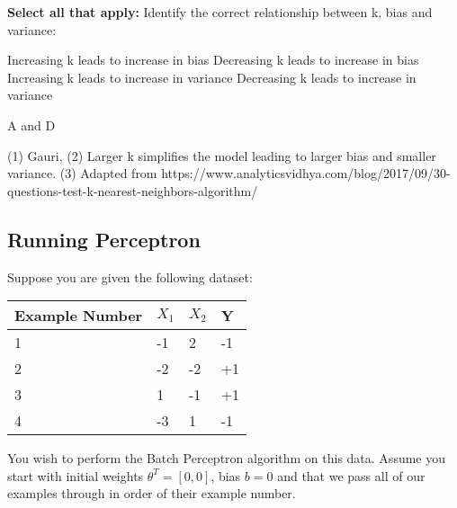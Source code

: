 \begin{questions}
    
   \question[1] \textbf{Select all that apply:} Identify the correct relationship between k, bias and variance:
    {%
    \checkboxchar{$\Box$} %
    \begin{checkboxes}
     \choice Increasing k leads to increase in bias
     \choice Decreasing k leads to increase in bias
     \choice Increasing k leads to increase in variance
     \choice Decreasing k leads to increase in variance
    \end{checkboxes}
    }
    \begin{soln}
    A and D
    \end{soln}
    \begin{qauthor}
    (1) Gauri, (2) Larger k simplifies the model leading to larger bias and smaller variance. (3) Adapted from https://www.analyticsvidhya.com/blog/2017/09/30-questions-test-k-nearest-neighbors-algorithm/  
    \end{qauthor}
   
   
\end{questions}
 

\subsection{Running Perceptron}

Suppose you are given the following dataset: 

\begin{table}[H]
        \centering
        \begin{tabular}{|l|l|l|l|}
        \hline
        Example Number & $X_1$ & $X_2$ & Y  \\ \hline
        1 & -1    & 2     & -1  \\ \hline
        2 & -2    & -2    & +1 \\ \hline
        3 & 1 & -1    & +1  \\ \hline
        4 & -3    & 1     & -1 \\ \hline
        \end{tabular}
        \label{tab:redbluepill}
\end{table}


You wish to perform the Batch Perceptron algorithm on this data. Assume you start with initial weights $\theta ^T = [0,0]$, bias $b=0$ and that we pass all of our examples through in order of their example number.


